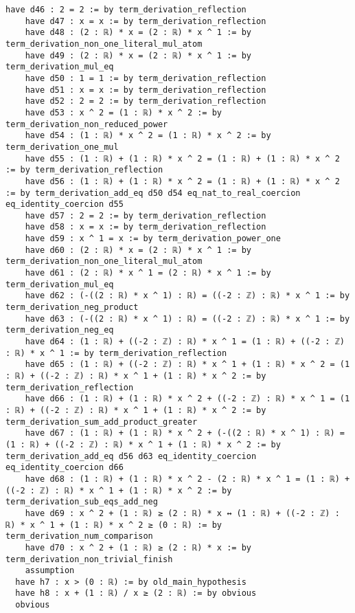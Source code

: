 \documentclass{article}
\begin{document}
\begin{tcolorbox}[colback=white!10, width=\linewidth]
\begin{lstlisting}[language=Lean4]
    have d46 : 2 = 2 := by term_derivation_reflection
    have d47 : x = x := by term_derivation_reflection
    have d48 : (2 : ℝ) * x = (2 : ℝ) * x ^ 1 := by term_derivation_non_one_literal_mul_atom
    have d49 : (2 : ℝ) * x = (2 : ℝ) * x ^ 1 := by term_derivation_mul_eq
    have d50 : 1 = 1 := by term_derivation_reflection
    have d51 : x = x := by term_derivation_reflection
    have d52 : 2 = 2 := by term_derivation_reflection
    have d53 : x ^ 2 = (1 : ℝ) * x ^ 2 := by term_derivation_non_reduced_power
    have d54 : (1 : ℝ) * x ^ 2 = (1 : ℝ) * x ^ 2 := by term_derivation_one_mul
    have d55 : (1 : ℝ) + (1 : ℝ) * x ^ 2 = (1 : ℝ) + (1 : ℝ) * x ^ 2 := by term_derivation_reflection
    have d56 : (1 : ℝ) + (1 : ℝ) * x ^ 2 = (1 : ℝ) + (1 : ℝ) * x ^ 2 := by term_derivation_add_eq d50 d54 eq_nat_to_real_coercion eq_identity_coercion d55
    have d57 : 2 = 2 := by term_derivation_reflection
    have d58 : x = x := by term_derivation_reflection
    have d59 : x ^ 1 = x := by term_derivation_power_one
    have d60 : (2 : ℝ) * x = (2 : ℝ) * x ^ 1 := by term_derivation_non_one_literal_mul_atom
    have d61 : (2 : ℝ) * x ^ 1 = (2 : ℝ) * x ^ 1 := by term_derivation_mul_eq
    have d62 : (-((2 : ℝ) * x ^ 1) : ℝ) = ((-2 : ℤ) : ℝ) * x ^ 1 := by term_derivation_neg_product
    have d63 : (-((2 : ℝ) * x ^ 1) : ℝ) = ((-2 : ℤ) : ℝ) * x ^ 1 := by term_derivation_neg_eq
    have d64 : (1 : ℝ) + ((-2 : ℤ) : ℝ) * x ^ 1 = (1 : ℝ) + ((-2 : ℤ) : ℝ) * x ^ 1 := by term_derivation_reflection
    have d65 : (1 : ℝ) + ((-2 : ℤ) : ℝ) * x ^ 1 + (1 : ℝ) * x ^ 2 = (1 : ℝ) + ((-2 : ℤ) : ℝ) * x ^ 1 + (1 : ℝ) * x ^ 2 := by term_derivation_reflection
    have d66 : (1 : ℝ) + (1 : ℝ) * x ^ 2 + ((-2 : ℤ) : ℝ) * x ^ 1 = (1 : ℝ) + ((-2 : ℤ) : ℝ) * x ^ 1 + (1 : ℝ) * x ^ 2 := by term_derivation_sum_add_product_greater
    have d67 : (1 : ℝ) + (1 : ℝ) * x ^ 2 + (-((2 : ℝ) * x ^ 1) : ℝ) = (1 : ℝ) + ((-2 : ℤ) : ℝ) * x ^ 1 + (1 : ℝ) * x ^ 2 := by term_derivation_add_eq d56 d63 eq_identity_coercion eq_identity_coercion d66
    have d68 : (1 : ℝ) + (1 : ℝ) * x ^ 2 - (2 : ℝ) * x ^ 1 = (1 : ℝ) + ((-2 : ℤ) : ℝ) * x ^ 1 + (1 : ℝ) * x ^ 2 := by term_derivation_sub_eqs_add_neg
    have d69 : x ^ 2 + (1 : ℝ) ≥ (2 : ℝ) * x ↔ (1 : ℝ) + ((-2 : ℤ) : ℝ) * x ^ 1 + (1 : ℝ) * x ^ 2 ≥ (0 : ℝ) := by term_derivation_num_comparison
    have d70 : x ^ 2 + (1 : ℝ) ≥ (2 : ℝ) * x := by term_derivation_non_trivial_finish
    assumption
  have h7 : x > (0 : ℝ) := by old_main_hypothesis
  have h8 : x + (1 : ℝ) / x ≥ (2 : ℝ) := by obvious
  obvious

\end{lstlisting}
\end{tcolorbox}
\end{document}
